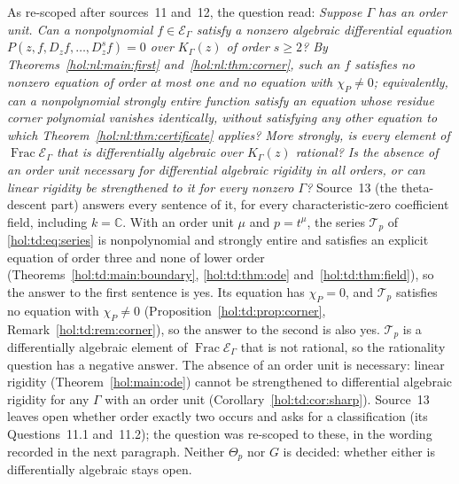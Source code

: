 \documentclass[11pt]{article}
\numberwithin{equation}{section}
\theoremstyle{definition}
\theoremstyle{remark}
\newcommand{\C}{\mathbb C}
\newcommand{\K}{K_\Gamma}
\newcommand{\E}{\mathcal E_\Gamma}
\begin{document}
As re-scoped after sources~11 and~12, the question read: \emph{Suppose $\Gamma$
has an order unit. Can a nonpolynomial $f\in\E$ satisfy a nonzero algebraic
differential equation $P(z,f,D_zf,\ldots,D_z^sf)=0$ over $\K(z)$ of order
$s\ge2$? By Theorems~\ref{hol:nl:main:first} and~\ref{hol:nl:thm:corner}, such
an $f$ satisfies no nonzero equation of order at most one and no equation
with $\chi_P\ne0$; equivalently, can a nonpolynomial strongly entire function
satisfy an equation whose residue corner polynomial vanishes identically,
without satisfying any other equation to which
Theorem~\ref{hol:nl:thm:certificate} applies? More strongly, is every element
of $\operatorname{Frac}\E$ that is differentially algebraic over $\K(z)$
rational? Is the absence of an order unit necessary for differential algebraic
rigidity in all orders, or can linear rigidity be strengthened to it for every
nonzero $\Gamma$?} Source~13 (the theta-descent part) answers every sentence
of it, for every characteristic-zero coefficient field, including $k=\C$.
With an order unit $\mu$ and $p=t^\mu$, the series $\mathcal T_p$ of
\eqref{hol:td:eq:series} is nonpolynomial and strongly entire and satisfies an
explicit equation of order three and none of lower order
(Theorems~\ref{hol:td:main:boundary}, \ref{hol:td:thm:ode}
and~\ref{hol:td:thm:field}), so the answer to the first sentence is yes. Its
equation has $\chi_P=0$, and $\mathcal T_p$ satisfies no equation with
$\chi_P\ne0$ (Proposition~\ref{hol:td:prop:corner},
Remark~\ref{hol:td:rem:corner}), so the answer to the second is also yes.
$\mathcal T_p$ is a differentially algebraic element of $\operatorname{Frac}\E$
that is not rational, so the rationality question has a negative answer. The
absence of an order unit is necessary: linear rigidity
(Theorem~\ref{hol:main:ode}) cannot be strengthened to differential algebraic
rigidity for any $\Gamma$ with an order unit (Corollary~\ref{hol:td:cor:sharp}).
Source~13 leaves open whether order exactly two occurs and asks for a
classification (its Questions~11.1 and~11.2); the question was re-scoped to
these, in the wording recorded in the next paragraph. Neither $\Theta_p$ nor
$G$ is decided: whether either is differentially algebraic stays open.
\end{document}
